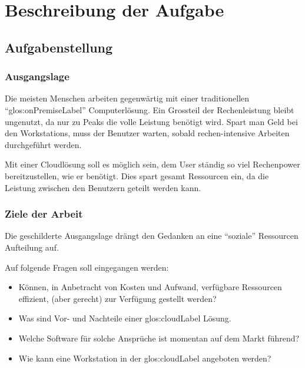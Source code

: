 \chapter{Beschreibung der Aufgabe}

\section{Aufgabenstellung}


\subsection{Ausgangslage}
Die meisten Menschen arbeiten gegenwärtig mit einer traditionellen "`\gls{glos:onPremiseLabel}"' Computerlösung.
Ein Grossteil der Rechenleistung bleibt ungenutzt, da nur zu Peaks die volle Leistung benötigt wird.
Spart man Geld bei den Workstations, muss der Benutzer warten, sobald rechen-intensive Arbeiten durchgeführt werden.

Mit einer Cloudlösung soll es möglich sein, dem User ständig so viel Rechenpower bereitzustellen, wie er benötigt.
Dies spart gesamt Ressourcen ein, da die Leistung zwischen den Benutzern geteilt werden kann.

\subsection{Ziele der Arbeit}
\label{sec:desc:targets}
Die geschilderte Ausgangslage drängt den Gedanken an eine “soziale” Ressourcen Aufteilung auf.

Auf folgende Fragen soll eingegangen werden:
\begin{itemize}
	\item Können, in Anbetracht von Kosten und Aufwand, verfügbare Ressourcen effizient, (aber gerecht) zur Verfügung gestellt werden?
	\item Was sind Vor- und Nachteile einer \Gls{glos:cloudLabel} Lösung.
	\item Welche Software für solche Ansprüche ist momentan auf dem Markt führend?
	\item Wie kann eine Workstation in der \Gls{glos:cloudLabel} angeboten werden?
\end{itemize}


